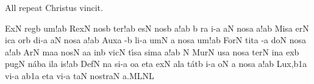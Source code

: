 {\itlyrics All repeat \rm Christus vincit.}

\bigskip



\initiumgregorianum
{}%
\sgn {}Ex\punctum N\egn
\spatium
\sgn r{e}g\punctum b\egn
\sgn {}u{m!}\punctum a\augmentum b\egn
\spatium
\divisiofinalis
\spatium
\sgn Rex\punctum N\egn
\spatium
\sgn n{o}s\punctum b\egn
\sgn te{r!}\punctum a\augmentum b\egn
\spatium
\divisiofinalis
\spatium
{}es\punctum N\egn
\spatium
\sgn n{o}s\punctum b\egn
{}a!\punctum a\augmentum b\egn
\spatium
\divisiofinalis
\spatium
\custos b
\lineaproxima
{}r\punctum a\egn
\sgn {}i-\punctum a\egn
\sgn {}a{}\punctum N\egn
\spatium
\sgn n{o}s\punctum a\egn
{}a!\punctum a\augmentum b\egn
\spatium
\divisiofinalis
\spatium
\sgn Mis\punctum a\egn
\sgn {}er\punctum N\egn
\sgn {}ic\punctum a\egn
\sgn {}or\punctum b\egn
\sgn di-\punctum a\egn
\sgn {}a{}\punctum N\egn
\spatium
\sgn n{o}s\punctum a\egn
{}a!\punctum a\augmentum b\egn
\spatium
\divisiofinalis
\spatium
\sgn Aux\punctum a\egn
\sgn {}{\'\i}-\punctum b\egn
\sgn li-\punctum a\egn
\sgn {}um\punctum N\egn
\spatium
\custos a
\lineaproxima
\sgn n{o}s\punctum a\egn
{}u{m!}\punctum a\augmentum b\egn
\spatium
\divisiofinalis
\spatium
\sgn For\punctum N\egn
\sgn tit\punctum a\egn
{}-\punctum a\egn
\sgn do{}\punctum N\egn
\spatium
\sgn n{o}s\punctum a\egn
{}a{!}\punctum a\augmentum b\egn
\spatium
\divisiofinalis
\spatium
\sgn {}Ar\punctum N\egn
\sgn ma{}\punctum a\egn
\spatium
\sgn n{o}s\punctum N\egn
{}a{}\punctum a\egn
\spatium
\sgn {}in\punctum b\egn
\sgn vic\punctum N\egn
\sgn t{\'\i}s\punctum a\egn
\sgn sim\punctum a\egn
\sgn {}a!\punctum a\augmentum b\egn
\spatium
\divisiofinalis
\spatium
\custos N
\lineaproxima
\sgn M{u}r\punctum N\egn
\sgn {}us\punctum a\egn
\spatium
\sgn n{o}s\punctum a\egn
\sgn ter\punctum N\egn
\spatium
\sgn {}in\punctum a\egn
\sgn {}ex\punctum b\egn
\sgn pug\punctum N\egn
\sgn n{\'a}b\punctum a\egn
\sgn {}il\punctum a\egn
\sgn {}i{s!}\punctum a\augmentum b\egn
\spatium
\divisiofinalis
\spatium
\sgn Def\punctum N\egn
{}n\punctum a\egn
\sgn si-\punctum a\egn
\sgn {}o{}\punctum a\egn
\spatium
\sgn {}et\punctum a\egn
\spatium
\sgn {}ex\punctum N\egn
\sgn {}al\punctum a\egn
\sgn t{\'a}t\punctum b\egn
\sgn {}i-\punctum a\egn
\sgn {}o{}\punctum N\egn
\spatium
\custos a
\lineaproxima
\sgn n{o}s\engl{}\punctum a\egn
{}a{!}\punctum a\augmentum b\egn
\spatium
\divisiofinalis
\spatium
\sgn Lu{x,}\omnes\episem b1\punctum a\en
\spatium
\sgn vi-\punctum a\egn
\sgn {}a{}\episem b1\punctum a\en
\spatium
\divisiominima
\spatium
\sgn {}et\punctum a\egn
\spatium
\sgn v{i}-\punctum a\egn
\sgn ta{}\punctum N\egn
\spatium
\sgn n{o}{str}\clivis aN\egn
\sgn {}a.\clivis ML\augmentumduplex NL\egn
\spatium
\Finisgregoriana

